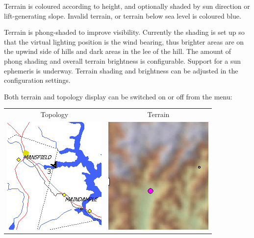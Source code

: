 \documentclass[a4paper,12pt]{refrep}
\begin{document}
Terrain is coloured according to height, and optionally shaded by sun
direction or lift-generating slope.  Invalid terrain, or terrain below
sea level is coloured blue.

Terrain is phong-shaded to improve visibility.  Currently the shading
is set up so that the virtual lighting position is the wind bearing,
thus brighter areas are on the upwind side of hills and dark areas in
the lee of the hill.  The amount of phong shading and overall terrain
brightness is configurable.  Support for a sun ephemeris is underway.
Terrain shading and brightness can be adjusted in the configuration
settings.

Both terrain and topology display can be switched on or off from the
menu:
\begin{quote}
\blink{}
\end{quote}

\begin{center}
\begin{tabular}{c c}
Topology & Terrain \\
\includegraphics[angle=0,width=0.4\linewidth,keepaspectratio='true']{figures/cut-topo.png} &
\includegraphics[angle=0,width=0.4\linewidth,keepaspectratio='true']{figures/cut-terrain.png} \\
\end{tabular}

\end{center}
\end{document}
